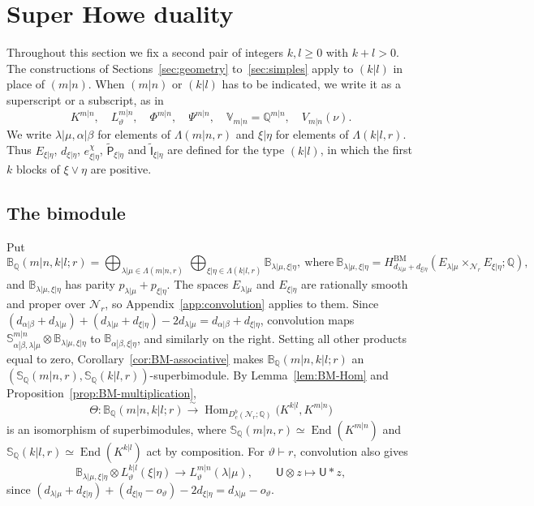 \documentclass[11pt,a4paper]{amsart}
\theoremstyle{definition}
\theoremstyle{remark}
\newcommand{\Q}{\mathbb Q}
\newcommand{\N}{\mathcal N}
\newcommand{\bS}{\mathbb S}
\newcommand{\bB}{\mathbb B}
\newcommand{\BM}{\mathrm{BM}}
\newcommand{\End}{\operatorname{End}}
\newcommand{\Hom}{\operatorname{Hom}}
\newcommand{\lm}{\lambda|\mu}
\newcommand{\xh}{\xi|\eta}
\newcommand{\ab}{\alpha|\beta}
\numberwithin{equation}{section}
\begin{document}
\section{Super Howe duality}
\label{sec:howe}

Throughout this section we fix a second pair of integers $k,l\geq0$
with $k+l>0$. The constructions of Sections~\ref{sec:geometry}
to~\ref{sec:simples} apply to $(k|l)$ in place of $(m|n)$. When
$(m|n)$ or $(k|l)$ has to be indicated, we write it as a superscript or a
subscript, as in
$$
K^{m|n},\quad L^{m|n}_\vartheta,\quad
\Phi^{m|n},\quad \Psi^{m|n},\quad
\mathbb V_{m|n}=\Q^{m|n},\quad V_{m|n}(\nu).
$$
We write $\lm,\ab$ for elements of $\Lambda(m|n,r)$ and $\xh$ for
elements of $\Lambda(k|l,r)$. Thus $E_{\xh}$, $d_{\xh}$,
$e^\chi_{\xh}$, $\widetilde{\mathsf P}_{\xh}$ and
$\widetilde{\mathsf I}_{\xh}$ are defined for the type $(k|l)$, in which
the first $k$ blocks of $\xi\vee\eta$ are positive.

\subsection{The bimodule}
\label{sec:mixed-types}
Put
\begin{equation}\label{eq:howe-bimodule}
\bB_\Q(m|n,k|l;r)=\bigoplus_{\lm\in\Lambda(m|n,r)}\,
\bigoplus_{\xh\in\Lambda(k|l,r)}\bB_{\lm,\xh},\ \text{where}\
\bB_{\lm,\xh}
=H^{\BM}_{d_{\lm}+d_{\xh}}(E_{\lm}\times_{\N_r}E_{\xh};\Q),
\end{equation}
and $\bB_{\lm,\xh}$ has parity $p_{\lm}+p_{\xh}$. The spaces
$E_{\lm}$ and $E_{\xh}$ are rationally smooth and proper over $\N_r$, so
Appendix~\ref{app:convolution} applies to them. Since
$(d_{\ab}+d_{\lm})+(d_{\lm}+d_{\xh})-2d_{\lm}=d_{\ab}+d_{\xh}$,
convolution maps $\bS^{m|n}_{\ab,\lm}\otimes\bB_{\lm,\xh}$ to
$\bB_{\ab,\xh}$, and similarly on the right. Setting all other
products equal to zero, Corollary~\ref{cor:BM-associative} makes
$\bB_\Q(m|n,k|l;r)$ an $(\bS_\Q(m|n,r),\bS_\Q(k|l,r))$-superbimodule. By
Lemma~\ref{lem:BM-Hom} and Proposition~\ref{prop:BM-multiplication},
\begin{equation}\label{eq:howe-Hom}
\Theta:\bB_\Q(m|n,k|l;r)\xrightarrow{\ \sim\ }
\Hom_{D_c^b(\N_r;\Q)}\bigl(K^{k|l},K^{m|n}\bigr)
\end{equation}
is an isomorphism of superbimodules, where
$\bS_\Q(m|n,r)\simeq\End(K^{m|n})$ and $\bS_\Q(k|l,r)\simeq\End(K^{k|l})$ act by
composition. For $\vartheta\vdash r$, convolution also gives
\begin{equation}\label{eq:howe-relevant}
\bB_{\lm,\xh}\otimes L^{k|l}_\vartheta(\xh)\longrightarrow
L^{m|n}_\vartheta(\lm),\qquad \mathsf U\otimes z\longmapsto\mathsf U*z,
\end{equation}
since $(d_{\lm}+d_{\xh})+(d_{\xh}-o_\vartheta)-2d_{\xh}
=d_{\lm}-o_\vartheta$.
\end{document}
